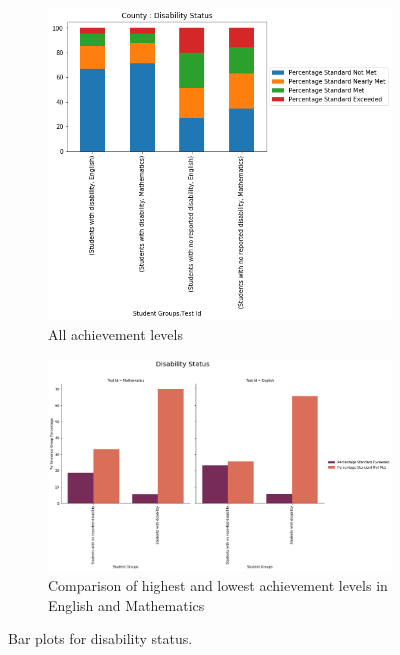\documentclass[11pt]{article}
\begin{document}
\begin{figure}[h!]
\centering
\begin{subfigure}{0.35\textwidth}
         \centering
         \includegraphics[width=\textwidth]{output_37_0.png}
         \caption{All achievement levels}
         \label{fig:Disability_all}
\end{subfigure}
\hfill
\begin{subfigure}{0.6\textwidth}
         \centering
         \includegraphics[width=\textwidth]{output_38_1.png}
         \caption{Comparison of highest and lowest achievement levels 
in English and Mathematics}
         \label{fig:Disability_two}
\end{subfigure}
\caption{Bar plots for disability status.}
\label{fig:all_Disability}
\end{figure}
\end{document}
